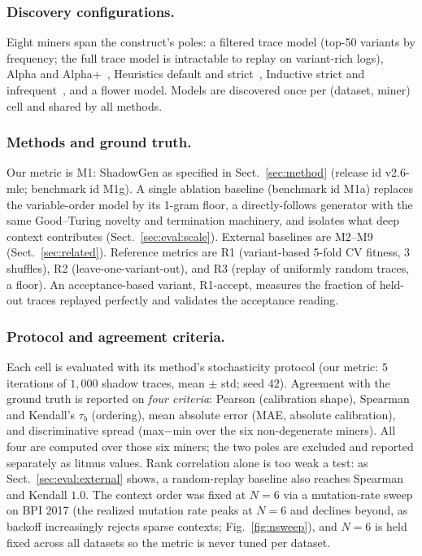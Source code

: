 \documentclass[runningheads]{llncs}
\newcommand{\chg}[1]{\textcolor{chgblue}{#1}}
\begin{document}
\subsubsection{Discovery configurations.}
Eight miners span the construct's poles: a filtered trace model (top-50 variants by frequency; the full trace model is intractable to replay on variant-rich logs), Alpha and Alpha+~\cite{vanderaalst2004alpha}, Heuristics default and strict~\cite{weijters2006hm}, Inductive strict and infrequent~\cite{leemans2013im,leemans2014imf}, and a flower model. Models are discovered once per (dataset, miner) cell and shared by all methods.

\subsubsection{Methods and ground truth.}
\chg{Our metric is M1: ShadowGen as specified in Sect.~\ref{sec:method} (release id v2.6-mle; benchmark id M1g). A single ablation baseline (benchmark id M1a) replaces the variable-order model by its 1-gram floor, a directly-follows generator with the same Good--Turing novelty and termination machinery, and isolates what deep context contributes (Sect.~\ref{sec:eval:scale}).} External baselines are M2--M9 (Sect.~\ref{sec:related}). Reference metrics are R1 (variant-based 5-fold CV fitness, 3 shuffles), R2 (leave-one-variant-out), and R3 (replay of uniformly random traces, a floor). An acceptance-based variant, R1-accept, measures the fraction of held-out traces replayed perfectly and validates the acceptance reading.

\subsubsection{Protocol and agreement criteria.}
Each cell is evaluated with its method's stochasticity protocol (our metric: $5$ iterations of $1{,}000$ shadow traces, mean $\pm$ std; seed $42$). Agreement with the ground truth is reported on \emph{four criteria}: Pearson (calibration shape), Spearman and Kendall's $\tau_b$ (ordering), mean absolute error (MAE, absolute calibration), and discriminative spread (max$-$min over the six non-degenerate miners). All four are computed over those six miners; the two poles are excluded and reported separately as litmus values. Rank correlation alone is too weak a test: as Sect.~\ref{sec:eval:external} shows, a random-replay baseline also reaches Spearman and Kendall $1.0$. The context order was fixed at $N{=}6$ via a mutation-rate sweep on BPI 2017 (the realized mutation rate peaks at $N{=}6$ and declines beyond, as backoff increasingly rejects sparse contexts; Fig.~\ref{fig:nsweep}), and $N{=}6$ is held fixed across all datasets so the metric is never tuned per dataset.
\end{document}

